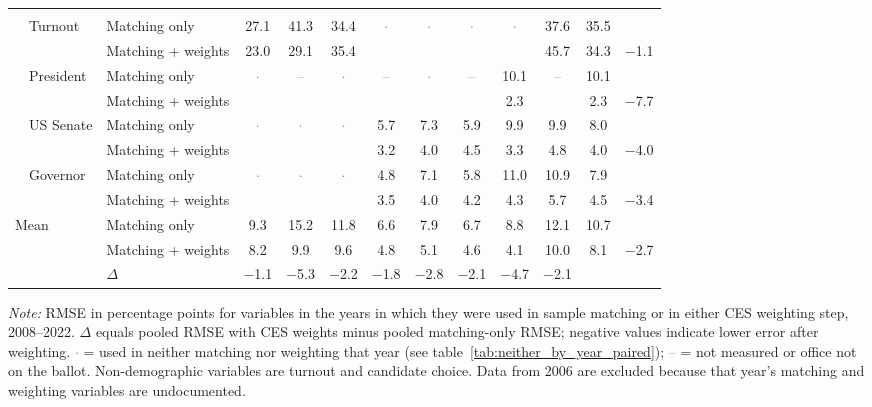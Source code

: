\begin{table}[!htbp]
{\begin{threeparttable}
\begin{tabular}{llcccccccccc}
\addlinespace[0.3em]
\multicolumn{12}{l}{Non-demographic} \\
\addlinespace[0.1em]
~~Turnout & Matching only & 27.1 & 41.3 & 34.4 & \textcolor{gray}{$\cdot$} & \textcolor{gray}{$\cdot$} & \textcolor{gray}{$\cdot$} & \textcolor{gray}{$\cdot$} & 37.6 & 35.5 & \\
 & Matching + weights & 23.0 & 29.1 & 35.4 &  &  &  &  & 45.7 & 34.3 & $-$1.1 \\
\addlinespace[0.1em]
~~President & Matching only & \textcolor{gray}{$\cdot$} & \textcolor{gray}{--} & \textcolor{gray}{$\cdot$} & \textcolor{gray}{--} & \textcolor{gray}{$\cdot$} & \textcolor{gray}{--} & 10.1 & \textcolor{gray}{--} & 10.1 & \\
 & Matching + weights &  &  &  &  &  &  & 2.3 &  & 2.3 & $-$7.7 \\
\addlinespace[0.1em]
~~US Senate & Matching only & \textcolor{gray}{$\cdot$} & \textcolor{gray}{$\cdot$} & \textcolor{gray}{$\cdot$} & 5.7 & 7.3 & 5.9 & 9.9 & 9.9 & 8.0 & \\
 & Matching + weights &  &  &  & 3.2 & 4.0 & 4.5 & 3.3 & 4.8 & 4.0 & $-$4.0 \\
\addlinespace[0.1em]
~~Governor & Matching only & \textcolor{gray}{$\cdot$} & \textcolor{gray}{$\cdot$} & \textcolor{gray}{$\cdot$} & 4.8 & 7.1 & 5.8 & 11.0 & 10.9 & 7.9 & \\
 & Matching + weights &  &  &  & 3.5 & 4.0 & 4.2 & 4.3 & 5.7 & 4.5 & $-$3.4 \\
\midrule
Mean\tnote{b} & Matching only & 9.3 & 15.2 & 11.8 & 6.6 & 7.9 & 6.7 & 8.8 & 12.1 & 10.7 & \\
 & Matching + weights & 8.2 & 9.9 & 9.6 & 4.8 & 5.1 & 4.6 & 4.1 & 10.0 & 8.1 & $-$2.7 \\
 & $\Delta$ & $-$1.1 & $-$5.3 & $-$2.2 & $-$1.8 & $-$2.8 & $-$2.1 & $-$4.7 & $-$2.1 & & \\
\bottomrule
\end{tabular}
\begin{tablenotes}
\footnotesize
\item \textit{Note:} RMSE in percentage points for variables in the years in which they were used in sample matching or in either CES weighting step, 2008--2022. $\Delta$ equals pooled RMSE with CES weights minus pooled matching-only RMSE; negative values indicate lower error after weighting. \textcolor{gray}{$\cdot$} = used in neither matching nor weighting that year (see table~\ref{tab:neither_by_year_paired}); \textcolor{gray}{--} = not measured or office not on the ballot. Non-demographic variables are turnout and candidate choice. Data from 2006 are excluded because that year's matching and weighting variables are undocumented.

\end{tablenotes}
\end{threeparttable}}
\end{table}
